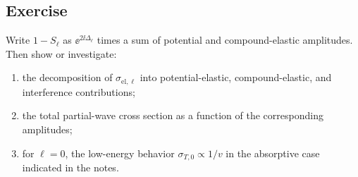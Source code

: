 \subsection*{Exercise}
Write $1-S_\ell$ as $\ee^{2\ii\Delta_\ell}$ times a sum of potential and compound-elastic amplitudes.  Then show or investigate:
\begin{enumerate}
  \item the decomposition of $\sigma_{\mathrm{el},\ell}$ into potential-elastic, compound-elastic, and interference contributions;
  \item the total partial-wave cross section as a function of the corresponding amplitudes;
  \item for $\ell=0$, the low-energy behavior $\sigma_{T,0}\propto 1/v$ in the absorptive case indicated in the notes.
\end{enumerate}
